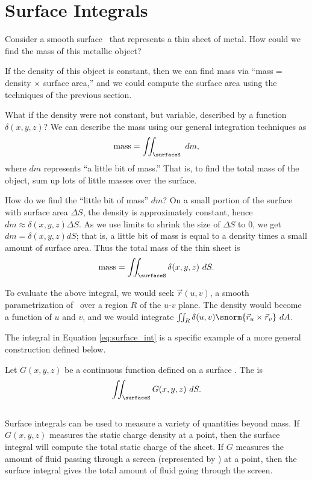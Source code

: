 \section{Surface Integrals}\label{sec:surface_integral}

Consider a smooth surface \surfaceS\ that represents a thin sheet of metal. How could we find the mass of this metallic object?

If the density of this object is constant, then we can find mass via ``mass$=$ density $\times$ surface area,'' and we could compute the surface area using the techniques of the previous section. 

What if the density were not constant, but variable, described by a function $\delta(x,y,z)$? We can describe the mass using our general integration techniques as
\[
\text{mass} = \iint_\surfaceS \ dm,
\]
where $dm$ represents ``a little bit of mass.'' That is, to find the total mass of the object, sum up lots of little masses over the surface.

How do we find the ``little bit of mass'' $dm$? On a small portion of the surface with surface area $\Delta S$, the density is approximately constant, hence $dm \approx \delta(x,y,z)\Delta S$. As we use limits to shrink the size of $\Delta S$ to 0, we get $dm = \delta(x,y,z)dS$; that is, a little bit of mass is equal to a density times a small amount of surface area. Thus the total mass of the thin sheet is
\begin{equation}
\text{mass} =\iint_\surfaceS \delta(x,y,z)\ dS.\label{eq:surface_int}
\end{equation}

To evaluate the above integral, we would seek $\vec r(u,v)$, a smooth parametrization of \surfaceS\ over a region $R$ of the $u$-$v$ plane. The density would become a function of $u$ and $v$, and we would integrate $\iint_R \delta(u,v)\snorm{\vec r_u\times \vec r_v}\ dA.$

The integral in Equation \eqref{eq:surface_int} is a specific example of a more general construction defined below.

{Let $G(x,y,z)$ be a continuous function defined on a surface \surfaceS. The  is
\[
\iint_\surfaceS G(x,y,z)\ dS.
\]
}\\

Surface integrals can be used to measure a variety of quantities beyond mass. If $G(x,y,z)$ measures the static charge density at a point, then the surface integral will compute the total static charge of the sheet. If $G$ measures the amount of fluid passing through a screen (represented by \surfaceS) at a point, then the surface integral gives the total amount of fluid going through the screen.\\

